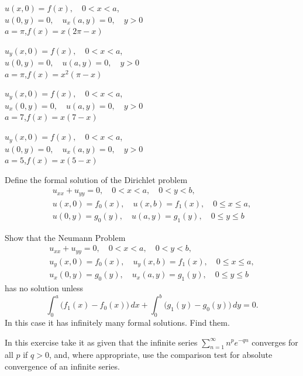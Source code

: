 \begin{exerciselist}
  \item\label{exer:12.3.31} $u(x,0)=f(x),\quad0<x<a$,\quad\\ $u(0,y)=0,\quad u_{x}(a,y)=0,\quad y>0$ \\ $a=\pi$,\quad $f(x)=x(2\pi-x)$

  \item\label{exer:12.3.32} $u_{y}(x,0)=f(x),\quad0<x<a$,\\ $u(0,y)=0,\quad u(a,y)=0,\quad y>0$ \\ $a=\pi$,\quad $f(x)=x^{2}(\pi-x)$

  \item\label{exer:12.3.33} $u_{y}(x,0)=f(x),\quad0<x<a$, \\ $u_{x}(0,y)=0,\quad u(a,y)=0,\quad y>0$ \\ $a=7$,\quad $f(x)=x(7-x)$

  \item\label{exer:12.3.34} $u_{y}(x,0)=f(x),\quad0<x<a$,\\ $u(0,y)=0,\quad u_{x}(a,y)=0,\quad y>0$ \\ $a=5$,\quad $f(x)=x(5-x)$

  \item\label{exer:12.3.35} Define the formal solution of the Dirichlet problem
  \[
    \begin{array}{c}
      u_{xx}+u_{yy}=0,\quad0<x<a,\quad0<y<b,                  \\
      u(x,0)=f_{0}(x),\quad u(x,b)=f_{1}(x),\quad0\le x\le a, \\
      u(0,y)=g_{0}(y),\quad u(a,y)=g_{1}(y),\quad0\le y\le b
    \end{array}
  \]

  \item\label{exer:12.3.36} Show that the Neumann Problem
  \[
    \begin{array}{c}
      u_{xx}+u_{yy}=0,\quad0<x<a,\quad0<y<b,                          \\
      u_{y}(x,0)=f_{0}(x),\quad u_{y}(x,b)=f_{1}(x),\quad0\le x\le a, \\
      u_{x}(0,y)=g_{0}(y),\quad u_{x}(a,y)=g_{1}(y),\quad0\le y\le b
    \end{array}
  \]
  has no solution unless
  \[
    \int_{0}^{a}\bigl(f_{1}(x)-f_{0}(x)\bigr)\,dx + \int_{0}^{b}\bigl(g_{1}(y)-g_{0}(y)\bigr)\,dy=0.
  \]
  In this case it has infinitely many formal solutions. Find them.

  \item\label{exer:12.3.37} In this exercise take it as given that the infinite series
        $\sum_{n=1}^{\infty}n^{p}e^{-qn}$ converges for all $p$ if $q>0$, and, where appropriate,
        use the comparison test for absolute convergence of an infinite series.


\end{exerciselist}
